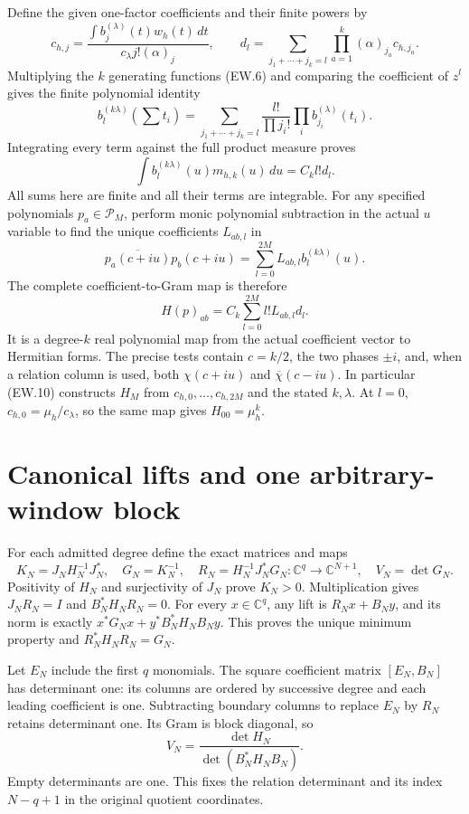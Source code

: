 \documentclass[11pt]{article}
\newcommand{\C}{\mathbb C}
\begin{document}
Define the given one-factor coefficients and their finite powers by
\[
 c_{h,j}=\frac{\int b_j^{(\lambda)}(t)w_h(t)\,dt}
                  {c_\lambda j!(\alpha)_j},\qquad
 d_l=\sum_{j_1+\cdots+j_k=l}\prod_{a=1}^k(\alpha)_{j_a}c_{h,j_a}.
                                                               \tag{EW.8}
\]
Multiplying the $k$ generating functions (EW.6) and comparing the
coefficient of $z^l$ gives the finite polynomial identity
\[
 b_l^{(k\lambda)}(\textstyle\sum t_i)
   =\sum_{j_1+\cdots+j_k=l}\frac{l!}{\prod j_i!}
                      \prod_i b_{j_i}^{(\lambda)}(t_i).
\]
Integrating every term against the full product measure proves
\[
 \int b_l^{(k\lambda)}(u)m_{h,k}(u)\,du=C_kl!d_l.
                                                               \tag{EW.9}
\]
All sums here are finite and all their terms are integrable. For any
specified polynomials $p_a\in\mathcal P_M$, perform monic
polynomial subtraction in the actual $u$ variable to find the unique
coefficients $L_{ab,l}$ in
\[
 \overline{p_a(c+iu)}p_b(c+iu)
      =\sum_{l=0}^{2M}L_{ab,l}b_l^{(k\lambda)}(u).
\]
The complete coefficient-to-Gram map is therefore
\[
 H(p)_{ab}=C_k\sum_{l=0}^{2M}l!L_{ab,l}d_l.                  \tag{EW.10}
\]
It is a degree-$k$ real polynomial map from the actual coefficient
vector to Hermitian forms. The precise tests contain $c=k/2$, the
two phases $\pm i$, and, when a relation column is used, both
$\chi(c+iu)$ and $\overline\chi(c-iu)$. In particular (EW.10)
constructs $H_M$ from $c_{h,0},\ldots,c_{h,2M}$ and the stated
$k,\lambda$. At $l=0$, $c_{h,0}=\mu_h/c_\lambda$, so the
same map gives $H_{00}=\mu_h^k$.

\section{Canonical lifts and one arbitrary-window block}

For each admitted degree define the exact matrices and maps
\[
 K_N=J_NH_N^{-1}J_N^*,\quad G_N=K_N^{-1},\quad
 R_N=H_N^{-1}J_N^*G_N:\C^q\longrightarrow\C^{N+1},\quad
 V_N=\det G_N.                                               \tag{EW.11}
\]
Positivity of $H_N$ and surjectivity of $J_N$ prove $K_N>0$.
Multiplication gives $J_NR_N=I$ and $B_N^*H_NR_N=0$.
For every $x\in\C^q$, any lift is $R_Nx+B_Ny$, and its norm
is exactly $x^*G_Nx+y^*B_N^*H_NB_Ny$. This proves the unique
minimum property and $R_N^*H_NR_N=G_N$.

Let $E_N$ include the first $q$ monomials. The square coefficient
matrix $[E_N,B_N]$ has determinant one: its columns are ordered by
successive degree and each leading coefficient is one. Subtracting
boundary columns to replace $E_N$ by $R_N$ retains determinant
one. Its Gram is block diagonal, so
\[
 V_N=\frac{\det H_N}{\det(B_N^*H_NB_N)}.                    \tag{EW.12}
\]
Empty determinants are one. This fixes the relation determinant and
its index $N-q+1$ in the original quotient coordinates.
\end{document}
